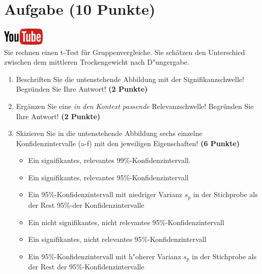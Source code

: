 \documentclass[a4paper, 10pt]{scrartcl}\usepackage[]{graphicx}\usepackage[]{xcolor}
\begin{document}
 
\clearpage

\section{Aufgabe \hfill (10 Punkte)}

\hfill\href{https://youtu.be/CN_O4fYPbhs}{\includegraphics[width =
  2cm]{img/youtube}}\\[1Ex]



Sie rechnen einen t-Test f{\"u}r Gruppenvergleiche. Sie sch{\"a}tzen den Unterschied
zwischen dem mittleren Trockengewicht nach D{"u}ngergabe. 

\begin{enumerate}
\item Beschriften Sie die untenstehende Abbildung mit der
  Signifikanzschwelle! Begr{\"u}nden Sie Ihre Antwort! \textbf{(2 Punkte)}
\item Erg{\"a}nzen Sie eine \textit{in den Kontext passende} Relevanzschwelle!
  Begr{\"u}nden Sie Ihre Antwort! \textbf{(2 Punkte)} 
\item Skizieren Sie in die
  untenstehende Abbildung sechs einzelne Konfidenzintervalle (a-f) mit den
  jeweiligen Eigenschaften! \textbf{(6 Punkte)}
  \begin{itemize}
  \item[(a)] Ein signifikantes, relevantes 99\%-Konfidenzintervall. 	
  \item[(b)] Ein signifikantes, relevantes 95\%-Konfidenzintervall 	
  \item[(c)] Ein 95\%-Konfidenzintervall mit niedriger Varianz $s_p$ in der Stichprobe als der Rest 95\%-der Konfidenzintervalle 	
  \item[(d)] Ein nicht signifikantes, nicht relevantes 95\%-Konfidenzintervall 
  \item[(e)] Ein signifikantes, nicht relevantes 95\%-Konfidenzintervall
  \item[(f)] Ein 95\%-Konfidenzintervall mit h{"o}herer Varianz $s_p$ in der Stichprobe als der Rest der 95\%-Konfidenzintervalle
  \end{itemize}
\end{enumerate}
\end{document}
